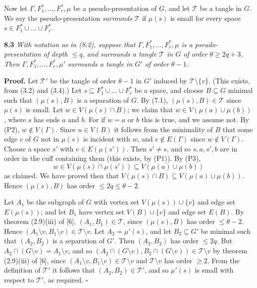 Now let $\Gamma, F_1^*, \dots, F_r^*, \mu$ be a pseudo-presentation of $G$, and let $\mathcal{T}$ be a tangle in $G$. We say the pseudo-presentation \textit{surrounds} $\mathcal{T}$ if $\mu(s)$ is small for every space $s \in F_1^* \cup \dots \cup F_r^*$.

\textbf{8.3} \textit{With notation as in (8.2), suppose that $\Gamma, F_1^*, \dots, F_r^*, \mu$ is a pseudo-presentation of depth $\le q$, and surrounds a tangle $\mathcal{T}$ in $G$ of order $\theta \ge 2q + 3$. Then $\Gamma, F_1^*, \dots, F_r^*, \mu'$ surrounds a tangle in $G'$ of order $\theta - 1$.}

\textbf{Proof.} Let $\mathcal{T}'$ be the tangle of order $\theta - 1$ in $G'$ induced by $\mathcal{T} \setminus \{v\}$. (This exists, from (3.2) and (3.4).) Let $s \subseteq F_1^* \cup \dots \cup F_r^*$ be a space, and choose $B \subseteq G$ minimal such that $(\mu(s), B)$ is a separation of $G$. By (7.1), $(\mu(s), B) \in \mathcal{T}$ since $\mu(s)$ is small. Let $w \in V(\mu(s) \cap B)$; we claim that $w \in V(\mu(a) \cup \mu(b))$, where $s$ has ends $a$ and $b$. For if $w = a$ or $b$ this is true, and we assume not. By (P2), $w \notin V(\Gamma)$. Since $u \in V(B)$ it follows from the minimality of $B$ that some edge $e$ of $G$ not in $\mu(s)$ is incident with $w$, and $e \notin E(\Gamma)$ since $w \notin V(\Gamma)$. Choose a space $s'$ with $e \in E(\mu(s'))$. Then $s' \ne s$, and so $s, a, s', b$ are in order in the cuff containing them (this exists, by (P1)). By (P3),
\begin{equation*}
w \in V(\mu(s) \cap \mu(s')) \subseteq V(\mu(a) \cup \mu(b))
\end{equation*}
as claimed. We have proved then that $V(\mu(s) \cap B) \subseteq V(\mu(a) \cup \mu(b))$. Hence $(\mu(s), B)$ has order $\le 2q \le \theta - 2$.

Let $A_1$ be the subgraph of $G$ with vertex set $V(\mu(s)) \cup \{v\}$ and edge set $E(\mu(s))$; and let $B_1$ have vertex set $V(B) \cup \{v\}$ and edge set $E(B)$. By theorem (2.9)(iii) of [6], $(A_1, B_1) \in \mathcal{T}$, since $(\mu(s), B)$ has order $\le \theta - 2$. Hence $(A_1 \setminus v, B_1 \setminus v) \in \mathcal{T} \setminus v$. Let $A_2 = \mu'(s)$, and let $B_2 \subseteq G'$ be minimal such that $(A_2, B_2)$ is a separation of $G'$. Then $(A_2, B_2)$ has order $\le 2q$. But $A_2 \cap (G \setminus v) = A_1 \setminus v$, and so $(A_2 \cap (G \setminus v), B_2 \cap (G \setminus v)) \in \mathcal{T} \setminus v$ by theorem (2.9)(iii) of [6], since $(A_1 \setminus v, B_1 \setminus v) \in \mathcal{T} \setminus v$ and $\mathcal{T} \setminus v$ has order $\ge 2$. From the definition of $\mathcal{T}'$ it follows that $(A_2, B_2) \in \mathcal{T}'$, and so $\mu'(s)$ is small with respect to $\mathcal{T}'$, as required. $\square$

